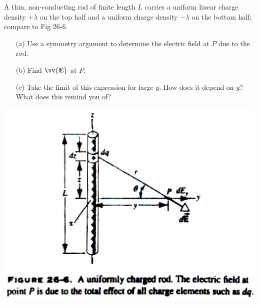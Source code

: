 \documentclass[11pt,letterpaper,boxed]{hmcpset}
\begin{document}
	
	\begin{problem}[HRK P26.7]
		A thin, non-conducting rod of finite length $L$ carries a uniform linear charge density $+\lambda$ on the top half and a uniform charge density $-\lambda$ on the bottom half; compare to Fig 26-6.
		
		\begin{enumerate}
			\item [(a)] Use a symmetry argument to determine the electric field at $P$ due to the rod.
			\item [(b)] Find $\vv{\textbf{E}}$ at $P$.
			\item [(c)] Take the limit of this expression for large $y$. How does it depend on $y$? What does this remind you of?
		\end{enumerate}
		
		\begin{center}
			\includegraphics[scale=0.5]{26-6.png}
		\end{center}
		
	\end{problem}
	
	\begin{solution}
		\vfill
	\end{solution}
	
\end{document}
